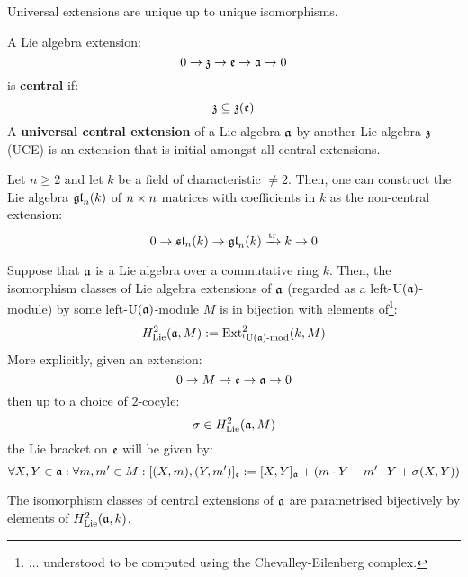         \begin{remark}
            Universal extensions are unique up to unique isomorphisms. 
        \end{remark}
        \begin{definition}
            A Lie algebra extension:
                $$0 \to \mathfrak{z} \to \mathfrak{e} \to \mathfrak{a} \to 0$$
            is \textbf{central} if:
                $$\mathfrak{z} \subseteq \mathfrak{z}(\mathfrak{e})$$
            A \textbf{universal central extension} of a Lie algebra $\mathfrak{a}$ by another Lie algebra $\mathfrak{z}$ (UCE) is an extension that is initial amongst all central extensions.
        \end{definition}
        \begin{example}
            Let $n \geq 2$ and let $k$ be a field of characteristic $\not = 2$. Then, one can construct the Lie algebra $\mathfrak{gl}_n(k)$ of $n \x n$ matrices with coefficients in $k$ as the non-central extension:
                $$0 \to \mathfrak{sl}_n(k) \to \mathfrak{gl}_n(k) \xrightarrow[]{\operatorname{tr}} k \to 0$$
        \end{example}
        \begin{proposition}[$H^2_{\Lie}$ = extensions]
            \cite[Theorem VIII.3.3]{hilton_stammbach_homological_algebra} Suppose that $\mathfrak{a}$ is a Lie algebra over a commutative ring $k$. Then, the isomorphism classes of Lie algebra extensions of $\mathfrak{a}$ (regarded as a left-$\mathrm{U}(\mathfrak{a})$-module) by some left-$\mathrm{U}(\mathfrak{a})$-module $M$ is in bijection with elements of\footnote{... understood to be computed using the Chevalley-Eilenberg complex.}:
                $$H^2_{\mathrm{Lie}}(\mathfrak{a}, M) := \mathrm{Ext}^2_{{}^l\mathrm{U}(\mathfrak{a})\text{-}\mathrm{mod}}(k, M)$$
            More explicitly, given an extension:
                $$0 \to M \to \mathfrak{e} \to \mathfrak{a} \to 0$$
            then up to a choice of $2$-cocyle:
                $$\sigma \in H^2_{\mathrm{Lie}}(\mathfrak{a}, M)$$
            the Lie bracket on $\mathfrak{e}$ will be given by:
                $$\forall X, Y \in \mathfrak{a}: \forall m, m' \in M: [ (X, m), (Y, m') ]_{\mathfrak{e}} := [X, Y]_{\mathfrak{a}} + ( m \cdot Y - m' \cdot Y + \sigma(X, Y) )$$
        \end{proposition}
        \begin{corollary}[Trivial cohomological coefficients = central extensions]
            The isomorphism classes of central extensions of $\mathfrak{a}$ are parametrised bijectively by elements of $H^2_{\mathrm{Lie}}(\mathfrak{a}, k)$.
        \end{corollary}
